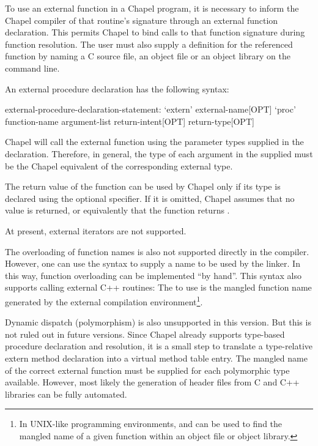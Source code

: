 To use an external function in a Chapel program, it is necessary to inform the
Chapel compiler of that routine's signature through an external function
declaration.  This permits Chapel to bind calls to that function signature
during function resolution.  The user must also supply a definition for the
referenced function by naming a C source file, an object file or an object
library on the  command line. 

An external procedure declaration has the following syntax:
\begin{syntax}
external-procedure-declaration-statement:
  `extern' external-name[OPT] `proc' function-name argument-list return-intent[OPT] return-type[OPT]
\end{syntax}

Chapel will call the external function using the parameter types supplied in
the  declaration.  Therefore, in general, the type of each argument
in the supplied  must be the Chapel equivalent of the
corresponding external type.  

The return value of the function can be used by Chapel only if its type is
declared using the optional  specifier.  If it is omitted,
Chapel assumes that no value is returned, or equivalently that the function
returns .

At present, external iterators are not supported.  

\begin{future}
The overloading of function names is
also not supported directly in the compiler.  However, one can use
the  syntax to supply a name to be used by the linker.  In
this way, function overloading can be implemented ``by hand''.  This syntax also
supports calling external C++ routines: The  to use is the
mangled function name generated by the external compilation
environment\footnote{In UNIX-like programming environments,  and 
can be used to find the mangled name of a given function within an object file
or object library.}.
\end{future}

\begin{future}
Dynamic dispatch (polymorphism) is also unsupported in this version.  But this
is not ruled out in future versions.  Since Chapel already supports type-based
procedure declaration and resolution, it is a small step to translate a
type-relative extern method declaration into a virtual method table entry.  The
mangled name of the correct external function must be supplied for each
polymorphic type available.  However, most likely the generation of 
header files from C and C++ libraries can be fully automated.
\end{future}

